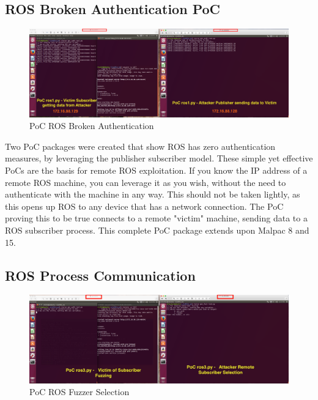 \documentclass[IEEEtran,letterpaper,10pt,notitlepage,draftclsnofoot,onecolumn]{article}
\begin{document}
\subsection{ROS Broken Authentication PoC}
\begin{figure}[H]
  \centering
    \includegraphics[width=\textwidth]{poc1}
    \caption{PoC ROS Broken Authentication}
\end{figure}

Two PoC packages were created that show ROS has zero authentication measures, by leveraging the publisher subscriber model.
These simple yet effective PoCs are the basis for remote ROS exploitation. If you know the IP address of a remote ROS machine, you can leverage it as you wish, without the need
to authenticate with the machine in any way. This should not be taken lightly, as this opens up ROS to any device that has a network connection. The PoC proving this to be true
connects to a remote "victim" machine, sending data to a ROS subscriber process. This complete PoC package extends upon Malpac 8 and 15.

\subsection{ROS Process Communication}
\begin{figure}[H]
  \centering
    \includegraphics[width=\textwidth]{poc2}
    \caption{PoC ROS Fuzzer Selection}
\end{figure}
\end{document}
